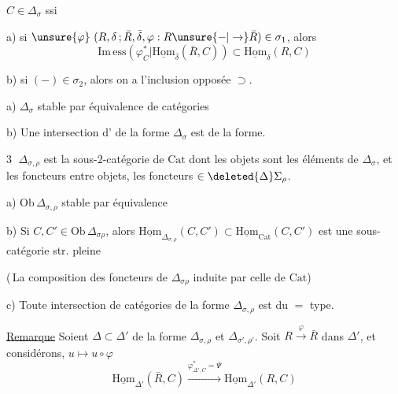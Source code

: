 
$C\in\Delta_\sigma$ ssi

a) si $\unsure{\varphi}\ (R,\delta\,;\bar R,\bar\delta,\varphi:R\unsure{-|\to}\bar R)\in\sigma_1$, alors
\[
\mathrm{Im\,ess}(\varphi_C^*\vert\underline{\mathrm{Hom}}_{\bar\delta}(\bar R,C))\subset\underline{\mathrm{Hom}}_\delta(R,C)
\]

b) si $(-)\in\sigma_2$, alors on a l'inclusion opposée $\supset$.

a) $\Delta_\sigma$ stable par équivalence de catégories

b) Une intersection d' de la forme $\Delta_\sigma$ est de la  forme.

\textcircled{3} $\Delta_{\sigma,\rho}$ est la  sous-$2$-catégorie de $\mathrm{Cat}$ dont les objets sont les éléments de $\Delta_\sigma$, et les foncteurs entre  objets, les foncteurs $\in\deleted{\Delta}\Sigma_\rho$.

a) $\mathrm{Ob}\,\Delta_{\sigma,\rho}$ stable par équivalence

b) Si $C,C'\in\mathrm{Ob}\,\Delta_{\sigma\rho}$, alors $\underline{\mathrm{Hom}}_{\Delta_{\sigma,\rho}}(C,C')\subset\underline{\mathrm{Hom}}_{\mathrm{Cat}}(C,C')$ est une sous-catégorie str. pleine 

(\,La composition des foncteurs de $\Delta_{\sigma\rho}$ induite par celle de $\mathrm{Cat}$)

c) Toute intersection de catégories de la forme $\Delta_{\sigma,\rho}$ est du $=$ type.


\uline{Remarque} Soient $\Delta\subset\Delta'$ de la forme $\Delta_{\sigma,\rho}$ et $\Delta_{\sigma',\rho'}$. Soit $R\xrightarrow{\varphi}\bar R$ dans $\Delta'$, et considérons,  $u\longmapsto u\circ\varphi$
\[
\underline{\mathrm{Hom}}_{\Delta'}(\bar R,C)\xrightarrow{\varphi^*_{\Delta',C}=\Psi}\underline{\mathrm{Hom}}_{\Delta'}(R,C)
\]

